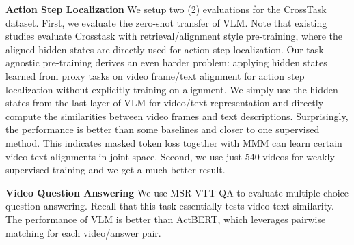 \documentclass[11pt,a4paper]{article}
\begin{document}
\noindent \textbf{Action Step Localization} We setup two (2) evaluations for the CrossTask dataset.
First, we evaluate the zero-shot transfer of VLM. Note that existing studies evaluate Crosstask with retrieval/alignment style pre-training, where the aligned hidden states are directly used for action step localization.
Our task-agnostic pre-training derives an even harder problem: applying hidden states learned from proxy tasks on video frame/text alignment for action step localization without explicitly training on alignment.
We simply use the hidden states from the last layer of VLM for video/text representation and directly compute the similarities between video frames and text descriptions.
Surprisingly, the performance is better than some baselines and closer to one supervised method. This indicates masked token loss together with MMM can learn certain video-text alignments in joint space.
Second, we use just 540 videos for weakly supervised training and we get a much better result.

\begin{table}
\centering
{}
\caption{Action step localization results on CrossTask.}
\end{table}

\noindent \textbf{Video Question Answering} We use MSR-VTT QA 
to evaluate multiple-choice question answering.
Recall that this task essentially tests video-text similarity.
The performance of VLM is better than ActBERT, which leverages pairwise matching for each video/answer pair.
\end{document}
